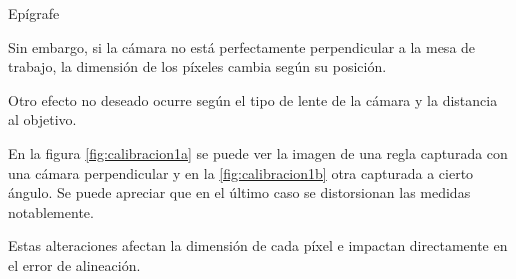    Epígrafe

Sin embargo, si la cámara no está perfectamente perpendicular a la mesa de trabajo, la dimensión de los píxeles cambia según su posición.\par
Otro efecto no deseado ocurre según el tipo de lente de la cámara y la distancia al objetivo.\par

En la figura \ref{fig:calibracion1a} se puede ver la imagen de una regla capturada con una cámara perpendicular y en la \ref{fig:calibracion1b} otra capturada a cierto ángulo. Se puede apreciar que en el último caso se distorsionan las medidas notablemente.\par 

Estas alteraciones afectan la dimensión de cada píxel e impactan directamente en el error de alineación.\par


